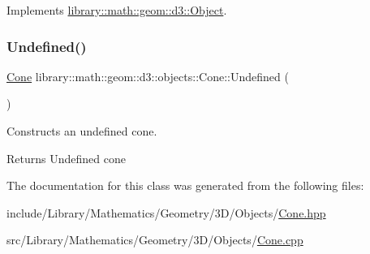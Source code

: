 Implements \hyperlink{classlibrary_1_1math_1_1geom_1_1d3_1_1_object_aa166f4ce4d116a248f0fc861c75012ca}{library\+::math\+::geom\+::d3\+::\+Object}.

\mbox{\label{classlibrary_1_1math_1_1geom_1_1d3_1_1objects_1_1_cone_add91d1f26389385cca599be25cb18716}} 
\subsubsection{\texorpdfstring{Undefined()}{Undefined()}}
{\footnotesize\ttfamily \hyperlink{classlibrary_1_1math_1_1geom_1_1d3_1_1objects_1_1_cone}{Cone} library\+::math\+::geom\+::d3\+::objects\+::\+Cone\+::\+Undefined (\begin{DoxyParamCaption}{ }\end{DoxyParamCaption})\hspace{0.3cm}{\ttfamily [static]}}



Constructs an undefined cone. 

\begin{DoxyReturn}{Returns}
Undefined cone 
\end{DoxyReturn}


The documentation for this class was generated from the following files\+:\begin{DoxyCompactItemize}
\item 
include/\+Library/\+Mathematics/\+Geometry/3\+D/\+Objects/\hyperlink{_cone_8hpp}{Cone.\+hpp}\item 
src/\+Library/\+Mathematics/\+Geometry/3\+D/\+Objects/\hyperlink{_cone_8cpp}{Cone.\+cpp}\end{DoxyCompactItemize}
